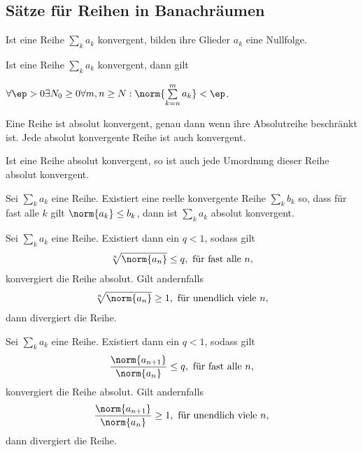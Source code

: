 \subsection{Sätze für Reihen in Banachräumen}

\begin{prop}[Nullfolgenkriterium]
Ist eine Reihe $\sum_k a_k$ konvergent, bilden ihre Glieder $a_k$ eine
Nullfolge.
\end{prop}

\begin{prop}[Cauchykriterium]
Ist eine Reihe $\sum_k a_k$ konvergent, dann gilt

$\forall \ep > 0 \exists N_0 \ge 0 \forall m,n \ge N : \norm{\sum
\limits_{k=n}^m a_k} < \ep$.
\end{prop}

\begin{prop}
Eine Reihe ist absolut konvergent, genau dann wenn ihre Absolutreihe beschränkt
ist. Jede absolut konvergente Reihe ist auch konvergent.
\end{prop}

\begin{prop}[Umordnungssatz]
Ist eine Reihe absolut konvergent, so ist auch jede Umordnung dieser Reihe
absolut konvergent.
\end{prop}

\begin{prop}[Majorantenkriterium]
Sei $\sum_k a_k$ eine Reihe. Existiert eine reelle konvergente Reihe $\sum_k
b_k$ so, dass für fast alle $k$ gilt $\norm{a_k} \le b_k$, dann ist $\sum_k a_k$
absolut konvergent.
\end{prop}

\begin{prop}[Wurzelkriterium]
Sei $\sum_k a_k$ eine Reihe. Existiert dann ein $q < 1$, sodass gilt
\begin{align*}
\sqrt[n]{\norm{a_n}} \le q, \text{ für fast alle } n,
\end{align*}
konvergiert die Reihe absolut. Gilt andernfalls
\begin{align*}
\sqrt[n]{\norm{a_n}} \ge 1,\text{ für unendlich viele } n,
\end{align*}
dann divergiert die Reihe.
\end{prop}

\begin{prop}[Quotientenkriterium]
Sei $\sum_k a_k$ eine Reihe. Existiert dann ein $q < 1$, sodass gilt
\begin{align*}
\frac{\norm{a_{n+1}}}{\norm{a_n}} \le q, \text{ für fast alle } n,
\end{align*}
konvergiert die Reihe absolut. Gilt andernfalls
\begin{align*}
\frac{\norm{a_{n+1}}}{\norm{a_n}} \ge 1, \text{ für unendlich viele } n,
\end{align*}
dann divergiert die Reihe.
\end{prop}

